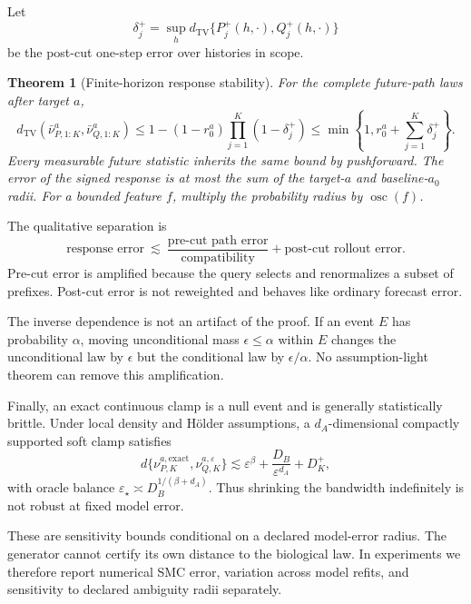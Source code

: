 \documentclass{article}
\newcommand{\TV}{d_{\mathrm{TV}}}
\newcommand{\osc}{\operatorname{osc}}
\newcommand{\eps}{\varepsilon}
\newtheorem{theorem}[definition]{Theorem}
\theoremstyle{remark}
\begin{document}
Let
\[
  \delta_j^+
  =
  \sup_h
  \TV\{P_j^+(h,\cdot),Q_j^+(h,\cdot)\}
\]
be the post-cut one-step error over histories in scope.

\begin{theorem}[Finite-horizon response stability]
\label{thm:finite-horizon}
For the complete future-path laws after target \(a\),
\begin{equation}
  \TV(\bar\nu_{P,1:K}^a,\bar\nu_{Q,1:K}^a)
  \leq
  1-(1-r_0^a)\prod_{j=1}^{K}(1-\delta_j^+)
  \leq
  \min\left\{1,r_0^a+\sum_{j=1}^{K}\delta_j^+\right\}.
  \label{eq:future-path-bound}
\end{equation}
Every measurable future statistic inherits the same bound by pushforward.
The error of the signed response is at most the sum of the target-\(a\) and
baseline-\(a_0\) radii. For a bounded feature \(f\), multiply the probability
radius by \(\osc(f)\).
\end{theorem}

The qualitative separation is
\begin{equation}
  \text{response error}
  \ \lesssim\
  \frac{\text{pre-cut path error}}{\text{compatibility}}
  +
  \text{post-cut rollout error}.
  \label{eq:qualitative-bound}
\end{equation}
Pre-cut error is amplified because the query selects and renormalizes a subset
of prefixes. Post-cut error is not reweighted and behaves like ordinary
forecast error.

The inverse dependence is not an artifact of the proof. If an event \(E\) has
probability \(\alpha\), moving unconditional mass \(\epsilon\leq\alpha\)
within \(E\) changes the unconditional law by \(\epsilon\) but the conditional
law by \(\epsilon/\alpha\). No assumption-light theorem can remove this
amplification.

Finally, an exact continuous clamp is a null event and is generally
statistically brittle. Under local density and H\"older assumptions, a
\(d_A\)-dimensional compactly supported soft clamp satisfies
\begin{equation}
  d\{\nu_{P,K}^{a,\mathrm{exact}},\nu_{Q,K}^{a,\eps}\}
  \lesssim
  \eps^\beta+\frac{D_B}{\eps^{d_A}}+D_K^+,
  \label{eq:soft-clamp-tradeoff}
\end{equation}
with oracle balance
\(\eps_\star\asymp D_B^{1/(\beta+d_A)}\). Thus shrinking the bandwidth
indefinitely is not robust at fixed model error.

These are sensitivity bounds conditional on a declared model-error radius.
The generator cannot certify its own distance to the biological law. In
experiments we therefore report numerical SMC error, variation across model
refits, and sensitivity to declared ambiguity radii separately.
\end{document}
